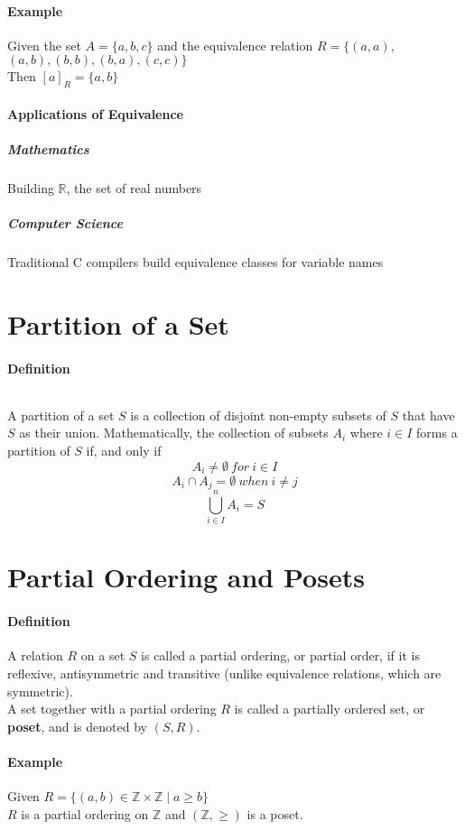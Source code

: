 \documentclass[10pt,a4paper]{book}
\begin{document}
\paragraph*{Example}
Given the set $A = \{a,b,c\}$ and the equivalence relation $R = \{(a,a),$\\$(a,b),(b,b),(b,a),(c,c)\}$\\
Then $[a]_R = \{a,b\}$
\paragraph*{Applications of Equivalence}
\subparagraph*{Mathematics}
Building $\mathbb{R}$, the set of real numbers
\subparagraph*{Computer Science}
Traditional C compilers build equivalence classes for variable names

\section{Partition of a Set}
\paragraph*{Definition}
$\ $\par
A partition of a set $S$ is a collection of disjoint non-empty subsets of $S$ that have $S$ as their union. Mathematically, the collection of subsets $A_i$ where $i \in I$ forms a partition of $S$ if, and only if 
\[A_{i} \neq \emptyset \ for \  i \in I\]
\[A_{i} \cap A_j = \emptyset \  when \ i \neq j\]
\[\bigcup_{i \in I}^{n} A_{i} = S\]

\section{Partial Ordering and Posets}
\paragraph*{Definition}
A relation $R$ on a set $S$ is called a partial ordering, or partial order, if it is reflexive, antisymmetric and transitive (unlike equivalence relations, which are symmetric).\\
A set together with a partial ordering $R$ is called a partially ordered set, or \textbf{poset}, and is denoted by $(S,R)$.
\paragraph*{Example}
Given $R = \{(a,b) \in \mathbb{Z} \times \mathbb{Z} \mid a \geqslant b \}$\\
$R$ is a partial ordering on $\mathbb{Z}$ and $(\mathbb{Z}, \geqslant)$ is a poset.
\end{document}
